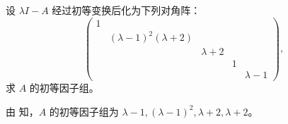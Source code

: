 \documentclass[../../main.tex]{subfiles}
\begin{document}
\begin{example}
设 $\lambda I - A$ 经过初等变换后化为下列对角阵：
\[
\begin{pmatrix}
1 & & & & \\
& (\lambda - 1)^2(\lambda + 2) & & & \\
& & \lambda + 2 & & \\
& & & 1 & \\
& & & & \lambda - 1
\end{pmatrix},
\]
求 $A$ 的初等因子组。
\end{example}
\begin{solution}
由 知，$A$ 的初等因子组为 $\lambda - 1,(\lambda - 1)^2,\lambda + 2,\lambda + 2$。

\end{solution}
\end{document}
